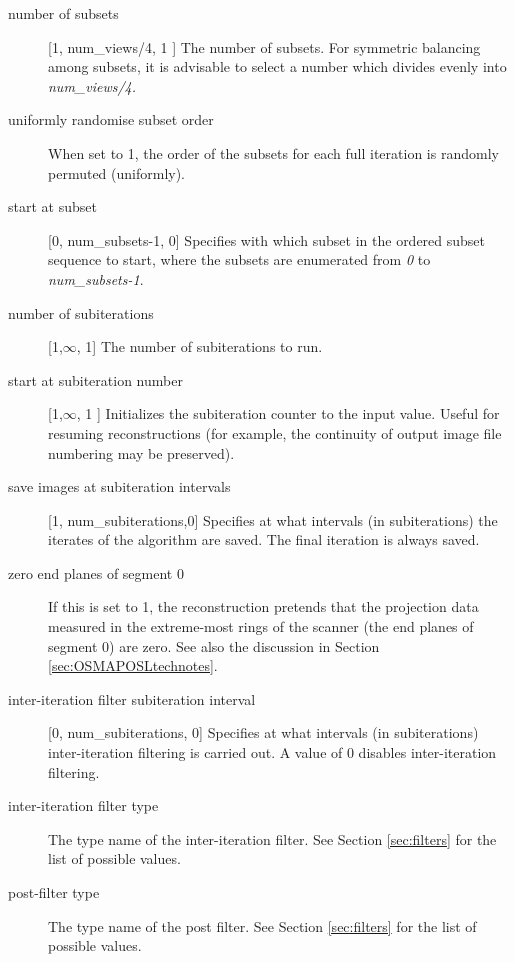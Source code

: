 \documentclass{article}
\begin{document}
\begin{description}
\item[number of subsets] [1, num\_views/4, 1 {]}
The number of subsets. For symmetric balancing among subsets, 
it is advisable to select a number which divides evenly into \textit{num\_views/4.}


\item[uniformly randomise subset order]
When set to 1, the order of the subsets for each full iteration 
is randomly permuted (uniformly).


\item[start at subset] [0, num\_subsets-1, 0{]}
Specifies with which subset in the ordered subset sequence to 
start, where the subsets are enumerated from \textit{0} to \textit{num\_subsets-1}. 

\item[number of subiterations] [1,\ensuremath{\infty}, 1{]}
The number of subiterations to run.


\item[start at subiteration number] [1,\ensuremath{\infty}, 1 {]}
Initializes the subiteration counter to the input value. Useful 
for resuming reconstructions (for example, the continuity of 
output image file numbering may be preserved).


\item[save images at subiteration intervals] [1, num\_subiterations,0{]} 
Specifies at what intervals (in subiterations) the iterates of 
the algorithm are saved. The final iteration is always saved.


\item[zero end planes of segment 0]
If this is set to 1, the reconstruction pretends that the projection 
data measured in the extreme-most rings of the scanner (the end 
planes of segment 0) are zero. See also the discussion in Section 
\ref{sec:OSMAPOSLtechnotes}.


\item[inter-iteration filter subiteration interval] [0, num\_subiterations, 0{]}
Specifies at what intervals (in subiterations) inter-iteration 
filtering is carried out. A value of 0 disables inter-iteration 
filtering.


\item[inter-iteration filter type]
The type name of the inter-iteration filter. See Section \ref{sec:filters}
for the list of possible values.


\item[post-filter type]
The type name of the post filter. See Section \ref{sec:filters} for the list 
of possible values.



\end{description}
\end{document}
